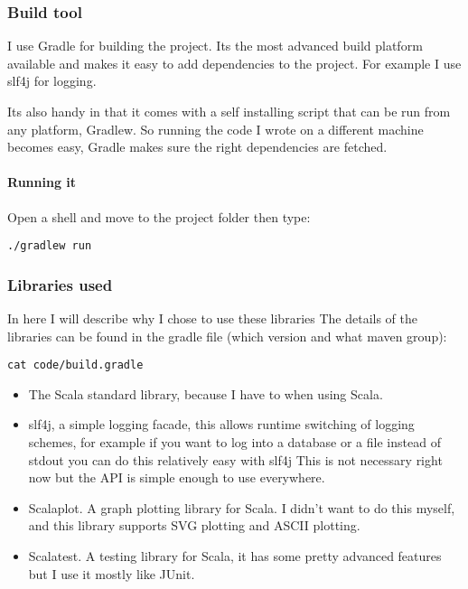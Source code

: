 \documentclass{article}
\begin{document}
\begin{empfile}
\subsubsection{Build tool}
I use Gradle for building the project. Its the most advanced build platform
available and makes it easy to add dependencies to the project.
For example I use slf4j for logging.

Its also handy in that it comes with a self installing script that can be run
from any platform, Gradlew. So running the code I wrote on a different machine
becomes easy, Gradle makes sure the right dependencies are fetched.

\paragraph{Running it}

Open a shell and move to the project folder then type:

\lstset{language=Bash}
\begin{lstlisting}[frame=single]
	./gradlew run
\end{lstlisting}

\subsubsection{Libraries used}
In here I will describe why I chose to use these libraries
The details of the libraries can be found in the gradle file (which
version and what maven group):

\begin{lstlisting}[frame=single]
	cat code/build.gradle
\end{lstlisting}


\begin{itemize}
	\item The Scala standard library, because I have to when using Scala.
	\item slf4j, a simple logging facade, this allows runtime switching of
		logging schemes, for example if you want to log into a database or
		a file instead of stdout you can do this relatively easy with slf4j
		This is not necessary right now but the API is simple enough to use
		everywhere.
	\item Scalaplot. A graph plotting library for Scala. I didn't want to
		do this myself, and this library supports SVG plotting and ASCII
		plotting.
	\item Scalatest. A testing library for Scala, it has some pretty advanced
		features but I use it mostly like JUnit.
\end{itemize}


\end{empfile}
\end{document}
